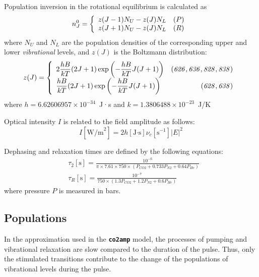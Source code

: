 \documentclass{report}
\begin{document}
Population inversion in the rotational equilibrium is calculated as
\begin{equation}
n_J^0 = \left\{ \begin{array}{ll}
  z(J-1) N_U  - z(J) N_L & (P)\\
  z(J+1) N_U  - z(J) N_L & (R)\end{array}\right.\\ 
\end{equation}
where $N_U$ and $N_L$ are the population densities of the corresponding upper and lower \textit{vibrational} levels, and $z(J)$ is the Boltzmann distribution:
\begin{equation}
z(J) = \left\{ \begin{array}{>{\displaystyle}l>{\displaystyle}r}
  2\frac{hB}{kT}(2J+1)\exp \left(-\frac{hB}{kT}J(J+1)\right) &(\mathit{626,636,828,838})\\
  \frac{hB}{kT}(2J+1)\exp \left(-\frac{hB}{kT}J(J+1)\right) &(\mathit{628,638})\end{array}\right.\\ 
\end{equation}
where $h = 6.62606957\times 10^{-34}$~J·s and $k = 1.3806488\times 10^{-23}$~J/K

Optical intensity $I$ is related to the field amplitude as follows:
\begin{equation}\label{eq:I}
I[\text{W/m}^2] = 2 h[\text{J·s}] \nu _c[\text{s}^{-1}] |E|^2
\end{equation}

Dephasing and relaxation times are defined by the following equations:
\begin{equation}\label{eq:relaxation}
\begin{aligned}
&\tau_2[\text{s}] = \frac{10^{- 6}}{\pi \times 7.61 \times 750 \times (P_{CO2}+0.733P_{N2}+0.64P_{He})}\\
&\tau _R[\text{s}] = \frac{10^{-7}}{750 \times (1.3P_{CO2}+1.2P_{N2}+0.6P_{He})}
\end{aligned}
\end{equation}
where pressure $P$ is measured in bars.


\subsection{Populations}
In the approximation used in the \textbf{\texttt{co2amp}} model, the processes of pumping and vibrational relaxation are slow compared to the duration of the pulse. Thus, only the stimulated transitions contribute to the change of the populations of vibrational levels during the pulse.
\end{document}
